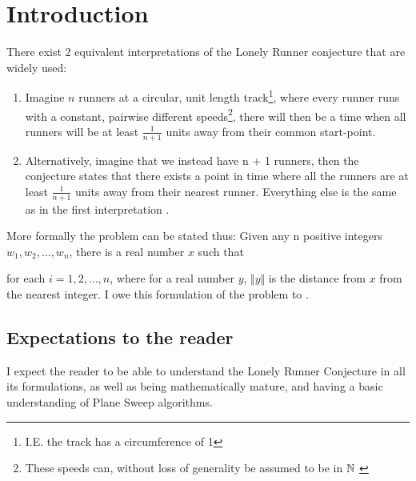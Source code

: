 \section{Introduction}
\label{introduction}

There exist 2 equivalent interpretations of the Lonely Runner conjecture that are widely used:
\begin{enumerate}
\item Imagine $n$ runners at a circular, unit length track\footnote{I.E. the track has a circumference of 1}, where every runner runs with a constant, pairwise different speeds\footnote{These speeds can, without loss of generality be assumed to be in $\mathbb{N}$ \cite{Bienia97flows.view-obstructions}}, there will then be a time when all runners will be at least $\frac{1}{n + 1}$ units away from their common start-point.\\

\item Alternatively, imagine that we instead have n + 1 runners, then the conjecture states that there exists a point in time where all the runners are at least $\frac{1}{n + 1}$ units away from their nearest runner. Everything else is the same as in the first interpretation \cite{Bienia97flows.view-obstructions}.\\
\end{enumerate}

More formally the problem can be stated thus: 
Given any n positive integers $w_1, w_2, \ldots, w_n$, there is a real number $x$ such that 

for each $i = 1, 2, \ldots, n$, where for a real number $y$, $\Vert y \Vert$ is the distance from $x$ from the nearest integer. I owe this formulation of the problem to \cite{ANote}.

\subsection{Expectations to the reader}
\label{expectations}
I expect the reader to be able to understand the Lonely Runner Conjecture in all its formulations, as well as being mathematically mature, and having a basic understanding of Plane Sweep algorithms.

